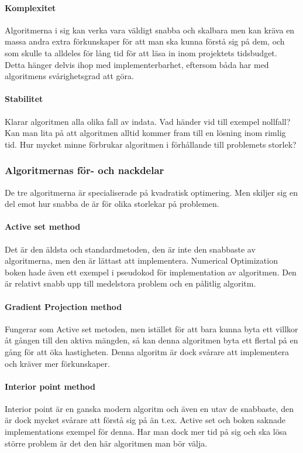 \paragraph{Komplexitet}
Algoritmerna i sig kan verka vara väldigt snabba och skalbara men kan kräva en massa andra extra förkunskaper för att man ska kunna förstå sig på dem, och som skulle ta alldeles för lång tid för att läsa in inom projektets tidsbudget. Detta hänger delvis ihop med implementerbarhet, eftersom båda har med algoritmens svårighetsgrad att göra.

\paragraph{Stabilitet}
Klarar algoritmen alla olika fall av indata. Vad händer vid till exempel nollfall? Kan man lita på att algoritmen alltid kommer fram till en lösning inom rimlig tid. Hur mycket minne förbrukar algoritmen i förhållande till problemets storlek? %

\subsubsection{Algoritmernas för- och nackdelar}
De tre algoritmerna är specialiserade på kvadratisk optimering. Men skiljer sig en del emot hur snabba de är för olika storlekar på problemen.

\paragraph{Active set method}
Det är den äldsta och standardmetoden, den är inte den snabbaste av algoritmerna, men den är lättast att implementera. Numerical Optimization boken hade även ett exempel i pseudokod för implementation av algoritmen. Den är relativt snabb upp till medelstora problem och en pålitlig algoritm.

\paragraph{Gradient Projection method}
Fungerar som Active set metoden, men istället för att bara kunna byta ett villkor åt gången till den aktiva mängden, så kan denna algoritmen byta ett flertal på en gång för att öka hastigheten. Denna algoritm är dock svårare att implementera och kräver mer förkunskaper.

\paragraph{Interior point method}
Interior point är en ganska modern algoritm och även en utav de snabbaste, den är dock mycket svårare att förstå sig på än t.ex. Active set och boken saknade implementations exempel för denna. Har man dock mer tid på sig och ska lösa större problem är det den här algoritmen man bör välja.

